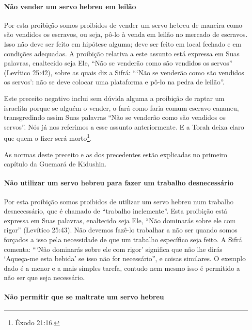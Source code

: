 \paragraph{Não vender um servo hebreu em leilão}

Por esta proibição somos proibidos de vender um servo hebreu de maneira
como são vendidos os escravos, ou seja, pô-lo à venda em leilão no
mercado de escravos. Isso não deve ser feito em hipótese alguma; deve
ser feito em local fechado e em condições adequadas. A proibição
relativa a este assunto está expressa em Suas palavras, enaltecido seja
Ele, ``Não se venderão como são vendidos os servos'' (Levítico 25:42),
sobre as quais diz a Sifrá: ```Não se venderão como são vendidos os
servos': não se deve colocar uma plataforma e pô-lo na pedra de
leilão''.

Este preceito negativo inclui sem dúvida alguma a proibição de raptar
um israelita porque se alguém o vender, o fará como faria comum escravo
cananeu, transgredindo assim Suas palavras ``Não se venderão como são
vendidos os servos''. Nós já nos referimos a esse assunto
anteriormente. E a Torah deixa claro que quem o fizer será
morto\footnote{Êxodo 21:16.}.

As normas deste preceito e as dos precedentes estão explicadas no
primeiro capítulo da Guemará de Kidushin.


\paragraph{Não utilizar um servo hebreu para fazer um trabalho desnecessário}

Por esta proibição somos proibidos de utilizar um servo hebreu num
trabalho desnecessário, que é chamado de ``trabalho inclemente''. Esta
proibição está expressa em Suas palavras, enaltecido seja Ele, ``Não
dominarás sobre ele com rigor'' (Levítico 25:43). Não devemos fazê-lo
trabalhar a não ser quando somos forçados a isso pela necessidade de
que um trabalho específico seja feito. A Sifrá comenta: ```Não dominarás
sobre ele com rigor' significa que não lhe dirás `Aqueça-me esta bebida'
se isso não for necessário'', e coisas similares. O exemplo dado é a
menor e a mais simples tarefa, contudo nem mesmo isso é permitido a não
ser que seja necessário.

\paragraph{Não permitir que se maltrate um servo hebreu}

